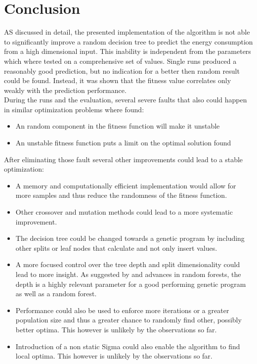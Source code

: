 \documentclass[conference]{IEEEtran}
\begin{document}
\section{Conclusion}
AS discussed in detail, the presented implementation of the algorithm is not able to significantly improve a random decision tree to predict the energy consumption from a high dimensional input. This inability is independent from the parameters which where tested on a comprehensive set of values. Single runs produced a reasonably good prediction, but no indication for a better then random result could be found.
Instead, it was shown that the fitness value correlates only weakly with the prediction performance.\\
During the runs and the evaluation, several severe faults that also could happen in similar optimization problems where found:

\begin{itemize}
\item An random component in the fitness function will make it unstable
\item An unstable fitness function puts a limit on the optimal solution found
\end{itemize}

After eliminating those fault several other improvements could lead to a stable optimization:

\begin{itemize}
\item  A memory and computationally efficient implementation would allow for more samples and thus reduce the randomness of the fitness function.
\item Other crossover and mutation methods could lead to a more systematic improvement.
\item The decision tree could be changed towards a genetic program by including other splits or leaf nodes that calculate and not only insert values.
\item A more focused control over the tree depth and split dimensionality could lead to more insight. As suggested by \cite{gathercole1996adverse} and advances in random forests, the depth is a highly relevant parameter for a good performing genetic program as well as a random forest.
\item Performance could also be used to enforce more iterations or a greater population size and thus a greater chance to randomly find other, possibly better optima.  This however is unlikely by the observations so far.
\item Introduction of a non static Sigma could also enable the algorithm to find local optima. This however is unlikely by the observations so far.
\end{itemize}
\end{document}
